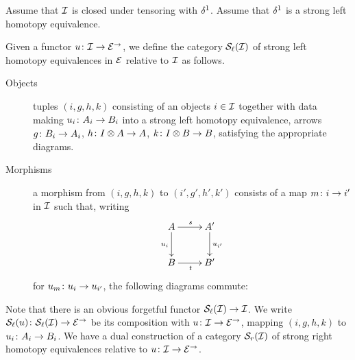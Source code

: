 \documentclass[reqno,10pt,a4paper,oneside]{amsart}
\begin{document}
Assume that $\cal{I}$ is closed under tensoring with $\rcyl$.
Assume that $\rcyl$ is a strong left homotopy equivalence.

\medskip

Given a functor $u \co \cal{I} \to \catE^{\to}$, we define the category $\cal{S}_\ell(\cal{I})$ of strong left homotopy equivalences in $\catE$ relative to $\cal{I}$ as
follows.
\begin{description}
\item[Objects] tuples $(i, g,h,k)$ consisting of an objects $i \in \cal{I}$ together with data making $u_i \co A_i \to B_i$ into a strong left homotopy equivalence,
\ie arrows $g \co B_i \to A_i$, $h \co \interval \otimes A \to A$, $k \co \interval \otimes B \to B$, satisfying the appropriate diagrams.
\item[Morphisms] a morphism from $(i,g, h, k)$ to $(i', g', h', k')$ consists of a map $m \co i \to i'$ in $\cal{I}$ such that, writing 
\[
\xymatrix{
A \ar[d]_{u_i}  \ar[r]^s & A' \ar[d]^{u_{i'}} \\
B \ar[r]_t & B'}
\]
for $u_m \co u_i \to u_{i'}$, the following diagrams commute:
\end{description}
Note that there is an obvious forgetful functor $\cal{S}_\ell(\cal{I}) \to \cal{I}$. We write $\cal{S}_\ell(u) \co \cal{S}_\ell(\cal{I}) \to \catE^{\to}$ be its composition with $u \co \cal{I} \to \catE^{\to}$, mapping $(i, g,h,k)$ to $u_i \co A_i \to B_i$. We have a dual construction of a category $\cal{S}_r(\cal{I})$ of strong right homotopy equivalences relative to  $u \co \cal{I} \to \catE^{\to}$.
\end{document}
